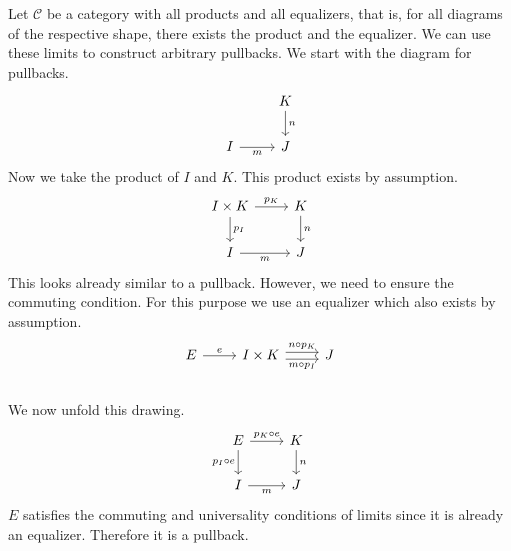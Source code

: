 \begin{example}
  Let $\mathscr C$ be a category with all products and all equalizers,
  that is, for all diagrams of the respective shape, there exists the product
  and the equalizer.
  We can use these limits to construct arbitrary pullbacks.
  We start with the diagram for pullbacks.
  \[
    \begin{tikzcd}
      & K \arrow{d}{n} \\
      I \arrow[swap]{r}{m} & J
    \end{tikzcd}
  \]
  Now we take the product of $I$ and $K$. This product exists by assumption.
  \[
    \begin{tikzcd}
      I \times K \arrow{r}{p_K} \arrow{d}{p_I} & K \arrow{d}{n} \\
      I \arrow[swap]{r}{m} & J
    \end{tikzcd}
  \]
  This looks already similar to a pullback.
  However, we need to ensure the commuting condition.
  For this purpose we use an equalizer which also exists by assumption.
  \[
    \begin{tikzcd}
      E \arrow{r}{e} &
      I \times K
      \arrow[r,shift right,swap, "m \circ p_I"] \arrow[r,shift left, "n \circ p_K"]
      & J \\
    \end{tikzcd}
  \]
  We now unfold this drawing.
  \[
    \begin{tikzcd}
      E \arrow[swap]{d}{p_I \circ e} \arrow{r}{p_K \circ e} & K \arrow{d}{n} \\
      I \arrow[swap]{r}{m} & J
    \end{tikzcd}
  \]
  $E$ satisfies the commuting and universality conditions of limits
  since it is already an equalizer.
  Therefore it is a pullback.
\end{example}

